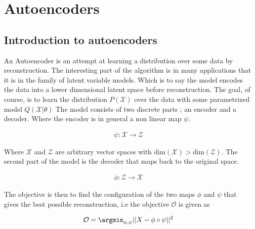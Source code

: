 
\section{Autoencoders}
\subsection{Introduction to autoencoders}\label{sec:intro_autoenc}
An Autoencoder is an attempt at learning a distribution over some data by reconstruction. The interesting part of the algorithm is in many applications that it is in the family of latent variable models. Which is to say the model encodes the data into a lower dimensional latent space before reconstruction. The goal, of course, is to learn the distribution $P(\mathcal{X})$ over the data with some parametrized model $Q(\mathcal{X}|\theta)$
The model consists of two discrete parts ; an encoder and a decoder.
Where the encoder is in general a non linear map $\psi$. 

\begin{align*}
  \psi: \mathcal{X} \rightarrow \mathcal{Z}
\end{align*}

\noindent Where $\mathcal{X} $ and $\mathcal{Z}$ are arbitrary vector spaces with $\text{dim}(\mathcal{X}) > \text{dim}(\mathcal{Z})$.
The second part of the model is the decoder that maps back to the original space.


\begin{align*}
  \phi: \mathcal{Z} \rightarrow \mathcal{X}
\end{align*}

\noindent The objective is then to find the configuration of the two maps $\phi$ and $\psi$
that gives the best possible reconstruction, i.e the objective $\mathcal{O}$ is given as

\begin{align}\label{eq:objective_autoenc}
  \mathcal{O} = \argmin_{\phi, \psi} || X - \phi \circ \psi||^2
\end{align}

